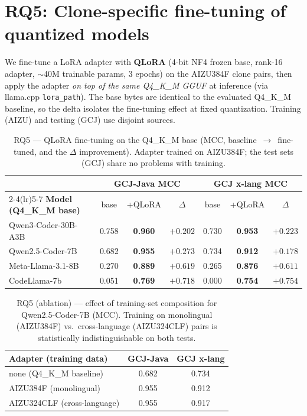 \documentclass[11pt]{article}
\newcommand{\best}[1]{\textbf{#1}}
\begin{document}
\section{RQ5: Clone-specific fine-tuning of quantized models}
We fine-tune a LoRA adapter with \textbf{QLoRA} (4-bit NF4 frozen base, rank-16
adapter, $\sim$40M trainable params, 3 epochs) on the AIZU384F clone pairs, then
apply the adapter \emph{on top of the same Q4\_K\_M GGUF} at inference (via
llama.cpp \texttt{lora\_path}). The base bytes are identical to the evaluated
Q4\_K\_M baseline, so the delta isolates the fine-tuning effect at fixed
quantization. Training (AIZU) and testing (GCJ) use disjoint sources.

\begin{table}[htbp]
  \centering
  \caption{RQ5 --- QLoRA fine-tuning on the Q4\_K\_M base (MCC,
           baseline~$\rightarrow$~fine-tuned, and the $\Delta$ improvement).
           Adapter trained on AIZU384F; the test sets (GCJ) share no problems
           with training.}
  \label{tab:rq5}
  \small
  \begin{tabular}{lcccccc}
    \toprule
    & \multicolumn{3}{c}{\textbf{GCJ-Java MCC}} & \multicolumn{3}{c}{\textbf{GCJ x-lang MCC}}\\
    \cmidrule(lr){2-4}\cmidrule(lr){5-7}
    \textbf{Model (Q4\_K\_M base)} & base & +QLoRA & $\Delta$ & base & +QLoRA & $\Delta$ \\
    \midrule
    Qwen3-Coder-30B-A3B & 0.758 & \best{0.960} & $+0.202$ & 0.730 & \best{0.953} & $+0.223$ \\
    Qwen2.5-Coder-7B  & 0.682 & \best{0.955} & $+0.273$ & 0.734 & \best{0.912} & $+0.178$ \\
    Meta-Llama-3.1-8B & 0.270 & \best{0.889} & $+0.619$ & 0.265 & \best{0.876} & $+0.611$ \\
    CodeLlama-7b      & 0.051 & \best{0.769} & $+0.718$ & 0.000 & \best{0.754} & $+0.754$ \\
    \bottomrule
  \end{tabular}
\end{table}

\begin{table}[htbp]
  \centering
  \caption{RQ5 (ablation) --- effect of training-set composition for Qwen2.5-Coder-7B
           (MCC). Training on monolingual (AIZU384F) vs.\ cross-language
           (AIZU324CLF) pairs is statistically indistinguishable on both tests.}
  \label{tab:rq5-ablation}
  \small
  \begin{tabular}{lcc}
    \toprule
    \textbf{Adapter (training data)} & \textbf{GCJ-Java} & \textbf{GCJ x-lang} \\
    \midrule
    none (Q4\_K\_M baseline)       & 0.682 & 0.734 \\
    AIZU384F (monolingual)         & 0.955 & 0.912 \\
    AIZU324CLF (cross-language)    & 0.955 & 0.917 \\
    \bottomrule
  \end{tabular}
\end{table}
\end{document}
